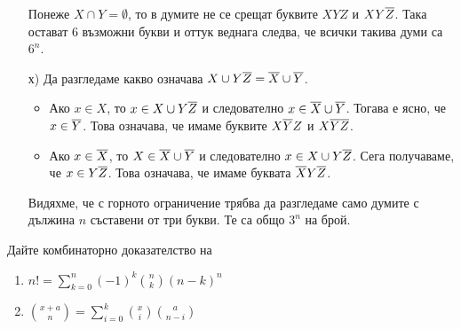\begin{solution}
\begin{enumerate}[a)]
    Понеже $X \cap Y = \emptyset$, то в думите не се срещат буквите $XYZ$ и $XY\overline{Z}$.
    Така остават $6$ възможни букви и оттук веднага следва, че всички такива думи са $6^n$.    
  \item[х)]
    Да разгледаме какво означава $X\cup Y\overline{Z} = \overline{X} \cup \overline{Y}$.
    \begin{itemize}
    \item 
      Ако $x \in X$, то $x \in X \cup Y\overline{Z}$ и следователно $x \in \overline{X} \cup \overline{Y}$.
      Тогава е ясно, че $x \in \overline{Y}$. Това означава, че имаме буквите $X\overline{Y}Z$ и $X\overline{Y}\overline{Z}$.
    \item
      Ако $x \in \overline{X}$, то $X \in \overline{X} \cup \overline{Y}$ и следователно $x \in X \cup Y\overline{Z}$.
      Сега получаваме, че $x \in Y\overline{Z}$. Това означава, че имаме буквата $\overline{X}Y\overline{Z}$.
    \end{itemize}
    Видяхме, че с горното ограничение трябва да разгледаме само думите с дължина $n$ съставени от три букви.
    Те са общо $3^n$ на брой.
  \end{enumerate}
\end{solution}

\begin{problem}
  Дайте комбинаторно доказателство на 
  \begin{enumerate}[1)]
  \item
    $n! = \sum^{n}_{k=0}(-1)^k\binom{n}{k}(n-k)^n$
  \item
    $\binom{x+a}{n} = \sum^{k}_{i=0}\binom{x}{i}\binom{a}{n-i}$
  \end{enumerate}
\end{problem}

